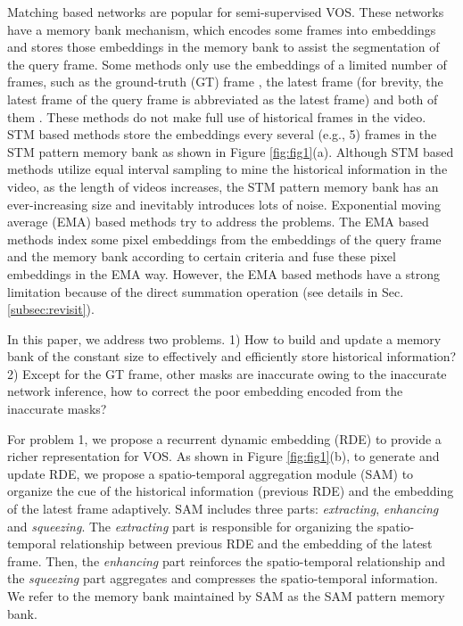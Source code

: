 \documentclass[10pt,twocolumn,letterpaper]{article}
\begin{document}
Matching based networks \cite{oh2018fast,yang2018efficient,lu2020video, oh2019video, seong2020kernelized, zhang2020transductive, cheng2021modular, hu2021learning,liang2021video,mao2021joint,seong2021hierarchical} are popular for semi-supervised VOS. These networks have a memory bank mechanism, which encodes some frames into embeddings and stores those embeddings in the memory bank to assist the segmentation of the query frame.
Some methods only use the embeddings of a limited number of frames, such as 
the ground-truth (GT) frame \cite{hu2018videomatch}, the latest frame
(for brevity, the latest frame of the query frame is abbreviated as the latest frame) \cite{perazzi2017learning} and both of them \cite{oh2018fast,yang2018efficient,lu2020video}. These methods do not make full use of historical frames in the video. STM based methods \cite{oh2019video, seong2020kernelized,zhang2020transductive,cheng2021modular,hu2021learning,liang2021video,mao2021joint,seong2021hierarchical} store the embeddings every several (e.g., 5) frames in the STM pattern memory bank as shown in Figure \ref{fig:fig1}(a). Although STM based methods utilize equal interval sampling to mine the historical information in the video, as the length of videos increases, the STM pattern memory bank has an ever-increasing size and inevitably introduces lots of noise. Exponential moving average (EMA) based methods \cite{li2020fast, liang2020video, wang2021swiftnet} try to address the problems. The EMA based methods index some pixel embeddings from the embeddings of the query frame and the memory bank according to certain criteria and fuse these pixel embeddings in the EMA way.  However, the EMA based methods have a strong limitation because of the direct summation operation (see details in Sec. \ref{subsec:revisit}). 







In this paper, we address two problems. 1) How to build and update a memory bank of the constant size to effectively and efficiently store historical information? 2) Except for the GT frame, other masks are inaccurate owing to the inaccurate network inference, how to correct the poor embedding encoded from the inaccurate masks?




For problem 1, 
we propose a recurrent dynamic embedding (RDE) to provide a richer representation for VOS. As shown in Figure \ref{fig:fig1}(b), to generate and update RDE, we propose a  spatio-temporal aggregation module (SAM) to organize the cue of the historical information (previous RDE) and the embedding of the latest frame adaptively. 
SAM includes three parts: \textit{extracting}, \textit{enhancing} and \textit{squeezing}. The \textit{extracting} part is responsible for organizing the spatio-temporal relationship between previous RDE and the embedding of the latest frame. Then, the \textit{enhancing} part reinforces the spatio-temporal relationship and the \textit{squeezing} part aggregates and compresses the spatio-temporal information. We refer to the memory bank maintained by SAM as the SAM pattern memory bank. 
\end{document}
